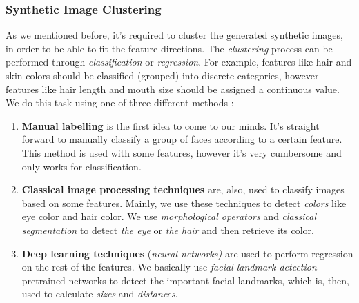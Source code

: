 \subsubsection{Synthetic Image Clustering}

As we mentioned before, it's required to cluster the generated synthetic images, in order to be able to fit the feature directions. The \emph{clustering} process can be performed through \emph{classification} or \emph{regression}. For example, features like hair and skin colors should be classified (grouped) into discrete categories, however features like hair length and mouth size should be assigned a continuous value. We do this task using one of three different methods :
\begin{enumerate}
    \item \textbf{Manual labelling} is the first idea to come to our minds. It's straight forward to manually classify a group of faces according to a certain feature. This method is used with some features, however it's very cumbersome and only works for classification.
    \item \textbf{Classical image processing techniques} are, also, used to classify images based on some features. Mainly, we use these techniques to detect \emph{colors} like eye color and hair color. We use \emph{morphological operators} and \emph{classical segmentation} to detect \emph{the eye} or \emph{the hair} and then retrieve its color.
    \item \textbf{Deep learning techniques} (\emph{neural networks)} are used to perform regression on the rest of the features. We basically use \emph{facial landmark detection} pretrained networks to detect the important facial landmarks, which is, then, used to calculate \emph{sizes} and \emph{distances}.
\end{enumerate}
